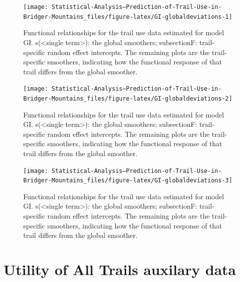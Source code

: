 \documentclass[
]{book}
\begin{document}
\begin{figure}

{\centering \texttt{[image: Statistical-Analysis--Prediction-of-Trail-Use-in-Bridger-Mountains\_files/figure-latex/GI-globaldeviations-1]} 

}

\caption{Functional relationships for the trail use data estimated for model GI. s(<single term>): the global smoothers; subsectionF: trail-specific random effect intercepts. The remaining plots are the trail-specific smoothers, indicating how the functional response of that trail differs from the global smoother.}\label{fig:GI-globaldeviations-1}
\end{figure}
\begin{figure}

{\centering \texttt{[image: Statistical-Analysis--Prediction-of-Trail-Use-in-Bridger-Mountains\_files/figure-latex/GI-globaldeviations-2]} 

}

\caption{Functional relationships for the trail use data estimated for model GI. s(<single term>): the global smoothers; subsectionF: trail-specific random effect intercepts. The remaining plots are the trail-specific smoothers, indicating how the functional response of that trail differs from the global smoother.}\label{fig:GI-globaldeviations-2}
\end{figure}
\begin{figure}

{\centering \texttt{[image: Statistical-Analysis--Prediction-of-Trail-Use-in-Bridger-Mountains\_files/figure-latex/GI-globaldeviations-3]} 

}

\caption{Functional relationships for the trail use data estimated for model GI. s(<single term>): the global smoothers; subsectionF: trail-specific random effect intercepts. The remaining plots are the trail-specific smoothers, indicating how the functional response of that trail differs from the global smoother.}\label{fig:GI-globaldeviations-3}
\end{figure}

\cleardoublepage

\hypertarget{appendix-appendix}{%
\appendix}


\hypertarget{ATDataUtility}{%
\chapter{Utility of All Trails auxilary data}\label{ATDataUtility}}
\end{document}
